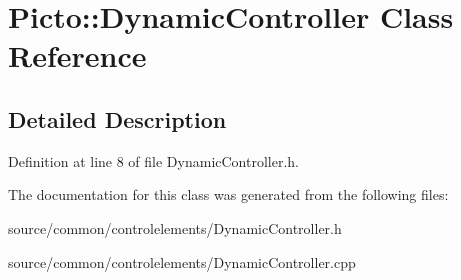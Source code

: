 \hypertarget{class_picto_1_1_dynamic_controller}{\section{Picto\-:\-:Dynamic\-Controller Class Reference}
\label{class_picto_1_1_dynamic_controller}
}


\subsection{Detailed Description}


Definition at line 8 of file Dynamic\-Controller.\-h.



The documentation for this class was generated from the following files\-:\begin{DoxyCompactItemize}
\item 
source/common/controlelements/Dynamic\-Controller.\-h\item 
source/common/controlelements/Dynamic\-Controller.\-cpp\end{DoxyCompactItemize}

